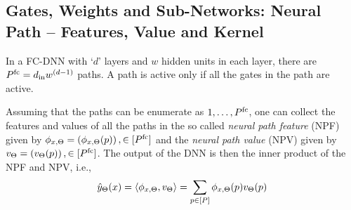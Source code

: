 \subsection{Gates, Weights and Sub-Networks: Neural Path -- Features, Value and Kernel}
In a FC-DNN with `$d$' layers and  $w$  hidden units in each layer, there are $P^{\text{fc}}=d_{\text{in}} w^{(d-1)}$ paths. A path is active only if all the gates in the path are active.
\begin{proposition}\label{prop:npf-npv}
 Assuming that the paths can be enumerate as $1,\ldots, P^{\text{fc}}$, one can collect the features and values of all the paths in the so called \emph{neural path feature} (NPF) given by $\phi_{x,\Theta}=\left(\phi_{x,\Theta}(p)\right),\in[P^{\text{fc}}]$ and the \emph{neural path value} (NPV) given by $v_{\Theta}=\left(v_{\Theta}(p)\right),\in[P^{\text{fc}}]$. The output of the DNN is then the inner product of the NPF and NPV, i.e., 
\begin{align}
\hat{y}_{\Theta}(x)=\langle \phi_{x,\Theta},v_{\Theta}\rangle=\sum_{p\in[P]}  \phi_{x,\Theta}(p) v_{\Theta}(p)
\end{align}
\end{proposition}
